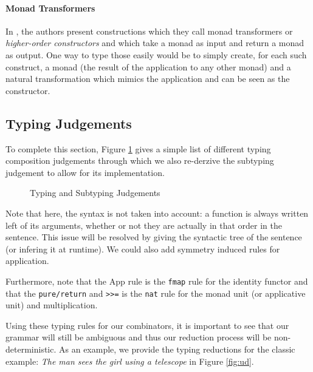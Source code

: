 \paragraph{Monad Transformers}
In \cite{bumfordEffectdrivenInterpretationFunctors2025}, the authors present
constructions which they call monad transformers or \emph{higher-order
	constructors} and which take a monad as input and return a monad as output.
One way to type those easily would be to simply create, for each such
construct, a monad (the result of the application to any other monad) and a
natural transformation which mimics the application and can be seen as the
constructor.

\subsection{Typing Judgements}\label{subsec:judgements}
To complete this section, Figure \ref{tab:judgements} gives a simple list of different typing composition judgements through which we also re-derzive the subtyping judgement to allow for its implementation.
\begin{figure}
	\caption{Typing and Subtyping Judgements}
	\label{tab:judgements}
\end{figure}
Note that here, the syntax is not taken into account: a function is always written left of its arguments, whether or not they are actually in that order in the sentence.
This issue will be resolved by giving the syntactic tree of the sentence (or infering it at runtime).
We could also add symmetry induced rules for application.

Furthermore, note that the App rule is the \texttt{fmap} rule for the identity functor and that the \texttt{pure/return} and \texttt{>>=} is the \texttt{nat} rule for the monad unit (or applicative unit) and multiplication.

\medskip

Using these typing rules for our combinators, it is important to see that our grammar will still be ambiguous and thus our reduction process will be non-deterministic.
As an example, we provide the typing reductions for the classic example: \textsl{The man sees the girl using a telescope} in Figure \ref{fig:ud}.

\begin{figure*}
	\centering
	\caption{Parsing trees for the typing of \textsl{The man sees the girl using a telescope}.}
	\label{fig:ud}
\end{figure*}

